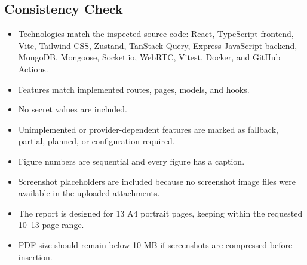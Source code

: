 \documentclass[11pt,a4paper]{article}
\begin{document}
\subsection{Consistency Check}
\begin{itemize}
  \item Technologies match the inspected source code: React, TypeScript frontend, Vite, Tailwind CSS, Zustand, TanStack Query, Express JavaScript backend, MongoDB, Mongoose, Socket.io, WebRTC, Vitest, Docker, and GitHub Actions.
  \item Features match implemented routes, pages, models, and hooks.
  \item No secret values are included.
  \item Unimplemented or provider-dependent features are marked as fallback, partial, planned, or configuration required.
  \item Figure numbers are sequential and every figure has a caption.
  \item Screenshot placeholders are included because no screenshot image files were available in the uploaded attachments.
  \item The report is designed for 13 A4 portrait pages, keeping within the requested 10--13 page range.
  \item PDF size should remain below 10 MB if screenshots are compressed before insertion.
\end{itemize}
\end{document}
